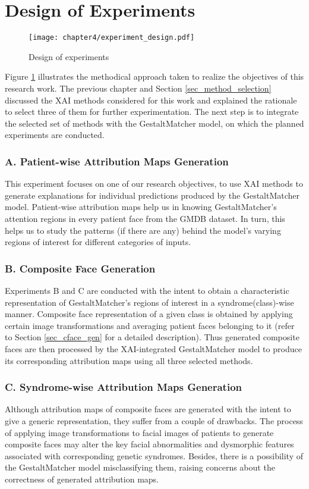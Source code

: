 \documentclass[../report.tex]{subfiles}
\begin{document}
    \section{Design of Experiments}\label{sec_exp_design}
    \noindent
    \begin{figure}[ht]
    	\hspace*{-0.5cm}      
       	\texttt{[image: chapter4/experiment\_design.pdf]}
        	\caption{Design of experiments}
    	    	\label{fig_exp_design}
    \end{figure}
    Figure \ref{fig_exp_design} illustrates the methodical approach taken to realize the objectives of this research work. The previous chapter and Section \ref{sec_method_selection} discussed the XAI methods considered for this work and explained the rationale to select three of them for further experimentation. The next step is to integrate the selected set of methods with the GestaltMatcher model, on which the planned experiments are conducted. 

    \subsubsection{A. Patient-wise Attribution Maps Generation}
    This experiment focuses on one of our research objectives, to use XAI methods to generate explanations for individual predictions produced by the GestaltMatcher model. 
    Patient-wise attribution maps help us in knowing GestaltMatcher's attention regions in every patient face from the GMDB dataset. In turn, this helps us to study the patterns (if there are any) behind the model's varying regions of interest for different categories of inputs.
    \subsubsection{B. Composite Face Generation}
    Experiments B and C are conducted with the intent to obtain a characteristic representation of GestaltMatcher's regions of interest in a syndrome(class)-wise manner. Composite face representation of a given class is obtained by applying certain image transformations and averaging patient faces belonging to it (refer to Section \ref{sec_cface_gen} for a detailed description). Thus generated composite faces are then processed by the XAI-integrated GestaltMatcher model to produce its corresponding attribution maps using all three selected methods.
    \subsubsection{C. Syndrome-wise Attribution Maps Generation}
    Although attribution maps of composite faces are generated with the intent to give a generic representation, they suffer from a couple of drawbacks. The process of applying image transformations to facial images of patients to generate composite faces may alter the key facial abnormalities and dysmorphic features associated with corresponding genetic syndromes. Besides, there is a possibility of the GestaltMatcher model misclassifying them, raising concerns about the correctness of generated attribution maps. 
    
\end{document}
